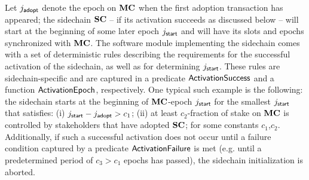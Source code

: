 Let $j_{\mathsf{adopt}}$ denote the epoch on $\mathbf{MC}$ when the first adoption transaction has
appeared; the sidechain $\mathbf{SC}$ -- if its activation succeeds as discussed
below -- will start at the beginning of some later epoch $j_{\mathsf{start}}$ and will have
its slots and epochs synchronized with $\mathbf{MC}$.
The software module implementing the sidechain comes with a set of
deterministic rules describing the requirements for the successful activation of
the sidechain, as well as for determining $j_{\mathsf{start}}$.
These rules are sidechain-specific and are captured in a predicate
$\mathsf{ActivationSuccess}$ and a function $\mathsf{ActivationEpoch}$, respectively.
One typical such example is the following:
the sidechain starts at the beginning of $\mathbf{MC}$-epoch $j_{\mathsf{start}}$ for the smallest
$j_{\mathsf{start}}$ that satisfies:
    (i)  $j_{\mathsf{start}} - j_{\mathsf{adopt}} > c_1$;
    (ii) at least $c_2$-fraction of stake on $\mathbf{MC}$ is controlled by stakeholders that
    have adopted $\mathbf{SC}$;
for some constants $c_1$,$c_2$. Additionally, if such a successful activation
does not occur until a failure condition captured by a predicate
$\mathsf{ActivationFailure}$ is met (e.g. until a predetermined period of $c_3>c_1$ epochs has
passed), the sidechain initialization is aborted.


